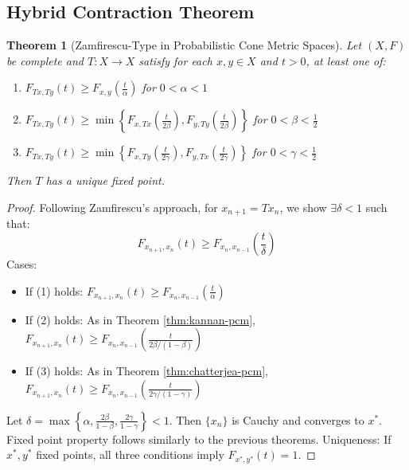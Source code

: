 \documentclass{amsart}
\newtheorem{theorem}{Theorem}[section]
\theoremstyle{definition}
\theoremstyle{remark}
\numberwithin{equation}{section}
\begin{document}
\subsection{Hybrid Contraction Theorem}

\begin{theorem}[Zamfirescu-Type in Probabilistic Cone Metric Spaces]\label{thm:zamfirescu-pcm}
Let $(X,F)$ be complete and $T: X \to X$ satisfy for each $x,y \in X$ and $t > 0$, at least one of:
\begin{enumerate}
    \item $F_{Tx,Ty}(t) \geq F_{x,y}\left(\frac{t}{\alpha}\right)$ for $0 < \alpha < 1$
    \item $F_{Tx,Ty}(t) \geq \min\left\{F_{x,Tx}\left(\frac{t}{2\beta}\right), F_{y,Ty}\left(\frac{t}{2\beta}\right)\right\}$ for $0 < \beta < \frac{1}{2}$
    \item $F_{Tx,Ty}(t) \geq \min\left\{F_{x,Ty}\left(\frac{t}{2\gamma}\right), F_{y,Tx}\left(\frac{t}{2\gamma}\right)\right\}$ for $0 < \gamma < \frac{1}{2}$
\end{enumerate}
Then $T$ has a unique fixed point.
\end{theorem}

\begin{proof}
Following Zamfirescu's approach, \cite{Zamfirescu1972} for $x_{n+1} = Tx_n$, we show $\exists \delta < 1$ such that:
\[
F_{x_{n+1},x_n}(t) \geq F_{x_n,x_{n-1}}\left(\frac{t}{\delta}\right)
\]
Cases:
\begin{itemize}
    \item If (1) holds: $F_{x_{n+1},x_n}(t) \geq F_{x_n,x_{n-1}}\left(\frac{t}{\alpha}\right)$
    \item If (2) holds: As in Theorem \ref{thm:kannan-pcm}, $F_{x_{n+1},x_n}(t) \geq F_{x_n,x_{n-1}}\left(\frac{t}{2\beta/(1-\beta)}\right)$
    \item If (3) holds: As in Theorem \ref{thm:chatterjea-pcm}, $F_{x_{n+1},x_n}(t) \geq F_{x_n,x_{n-1}}\left(\frac{t}{2\gamma/(1-\gamma)}\right)$
\end{itemize}
Let $\delta = \max\left\{\alpha, \frac{2\beta}{1-\beta}, \frac{2\gamma}{1-\gamma}\right\} < 1$. Then $\{x_n\}$ is Cauchy and converges to $x^*$. Fixed point property follows similarly to the previous theorems. Uniqueness: If $x^*, y^*$ fixed points, all three conditions imply $F_{x^*,y^*}(t) = 1$.

\end{proof}
\end{document}
